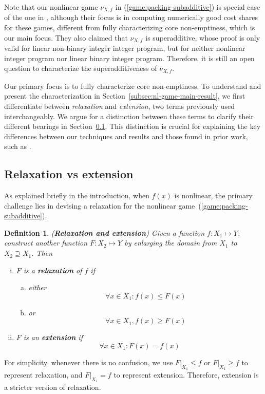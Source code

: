 \documentclass[11pt]{article}\usepackage[]{graphicx}\usepackage[]{xcolor}
\newtheorem{deff}{Definition}
\begin{document}
Note that our nonlinear game $\nu_{X, f}$ in (\ref{game:packing-subadditive}) is special case of the one in \citep[Equation (2)]{liu2016computing}, although their focus is in computing numerically good cost shares for these games, different from fully characterizing core non-emptiness, which is our main focus. They also claimed that $\nu_{X, f}$ is superadditive, whose proof is only valid for linear non-binary integer integer program, but for neither nonlinear integer program nor linear binary integer program. Therefore, it is still an open question to characterize the superadditiveness of $\nu_{X, f}$.



Our primary focus is to fully characterize core non-emptiness. To understand and present the characterization in Section~\ref{subsec:nl-game-main-result}, we first differentiate between \emph{relaxation} and \emph{extension}, two terms previously used interchangeably. We argue for a distinction between these terms to clarify their different bearings in Section~\ref{subsec:relax-vsa-ext}. This distinction is crucial for explaining the key differences between our techniques and results and those found in prior work, such as \citep{samet1984core,deng1999algorithmic}.





\subsection{Relaxation vs extension}\label{subsec:relax-vsa-ext}


As explained briefly in the introduction, when \( f(x) \) is nonlinear, the primary challenge lies in devising a relaxation for the nonlinear game~(\ref{game:packing-subadditive}). 


\begin{deff}\label{def:relaxation-extension} (\textbf{Relaxation and extension})
Given a function $f: X_1\mapsto Y$, construct another function $F: X_2\mapsto Y$ by enlarging the domain from $X_1$ to $X_2\supseteq X_1$. Then 
\begin{enumerate}[(i)]
\item $F$ is a \textbf{relaxation} of $f$ if  
\begin{enumerate}[(a)]
\item either 
\[
 \forall x\in X_1: f(x)\le F(x)
\]
\item or
\[
\forall x\in X_1, f(x)\ge F(x)
\]
\end{enumerate}
\item $F$ is an \textbf{extension} if 
\[
\forall x\in X_1: F(x)=f(x)
\]
\end{enumerate}
\end{deff}
For simplicity, whenever there is no confusion, we use $F|_{X_1}\le f$ or $F|_{X_1}\ge f$ to represent relaxation, and $F|_{X_1}= f$ to represent extension. Therefore, extension is a stricter version of relaxation. 
\end{document}
